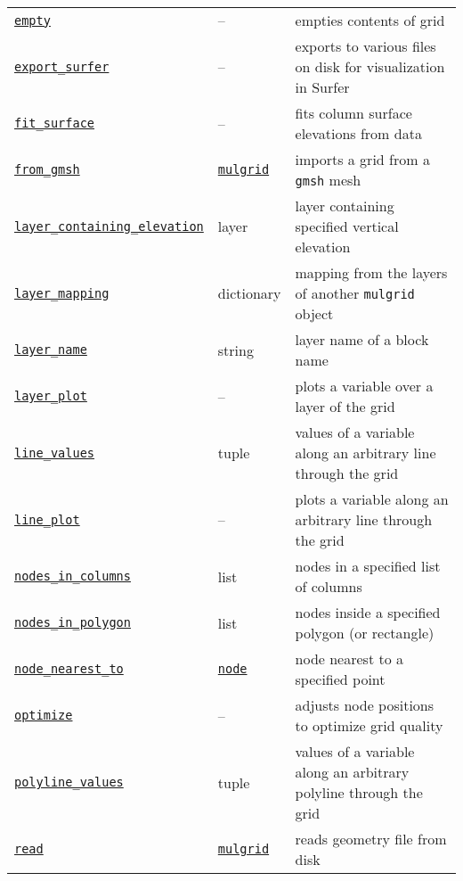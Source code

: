 \begin{center}
\begin{longtable}{|l|l|p{70mm}|}
  \hyperref[sec:mulgrid:empty]{\texttt{empty}} & --  & empties contents of grid\\
  \hyperref[sec:mulgrid:export_surfer]{\texttt{export\_surfer}} & -- & exports to various files on disk for visualization in Surfer\\ 
  \hyperref[sec:mulgrid:fit_surface]{\texttt{fit\_surface}} & -- & fits column surface elevations from data\\ 
  \hyperref[sec:mulgrid:from_gmsh]{\texttt{from\_gmsh}} & \hyperref[mulgrids]{\texttt{mulgrid}} & imports a grid from a \texttt{gmsh} mesh\\ 
  \hyperref[sec:mulgrid:layer_containing_elevation]{\texttt{layer\_containing\_elevation}} & layer & layer containing specified vertical elevation\\
  \hyperref[sec:mulgrid:layer_mapping]{\texttt{layer\_mapping}} & dictionary & mapping from the layers of another \texttt{mulgrid} object\\
  \hyperref[sec:mulgrid:layer_name]{\texttt{layer\_name}} & string & layer name of a block name\\ 
  \hyperref[sec:mulgrid:layer_plot]{\texttt{layer\_plot}} & -- & plots a variable over a layer of the grid\\
  \hyperref[sec:mulgrid:line_values]{\texttt{line\_values}} & tuple & values of a variable along an arbitrary line through the grid\\
  \hyperref[sec:mulgrid:line_plot]{\texttt{line\_plot}} & -- & plots a variable along an arbitrary line through the grid\\
  \hyperref[sec:mulgrid:nodes_in_columns]{\texttt{nodes\_in\_columns}} & list & nodes in a specified list of columns\\ 
  \hyperref[sec:mulgrid:nodes_in_polygon]{\texttt{nodes\_in\_polygon}} & list & nodes inside a specified polygon (or rectangle)\\ 
  \hyperref[sec:mulgrid:node_nearest_to]{\texttt{node\_nearest\_to}} & \hyperref[nodeobjects]{\texttt{node}} & node nearest to a specified point\\ 
  \hyperref[sec:mulgrid:optimize]{\texttt{optimize}} & -- & adjusts node positions to optimize grid quality\\
  \hyperref[sec:mulgrid:polyline_values]{\texttt{polyline\_values}} & tuple & values of a variable along an arbitrary polyline through the grid\\
  \hyperref[sec:mulgrid:read]{\texttt{read}} & \hyperref[mulgrids]{\texttt{mulgrid}} & reads geometry file from disk\\

\end{longtable}
\end{center}
